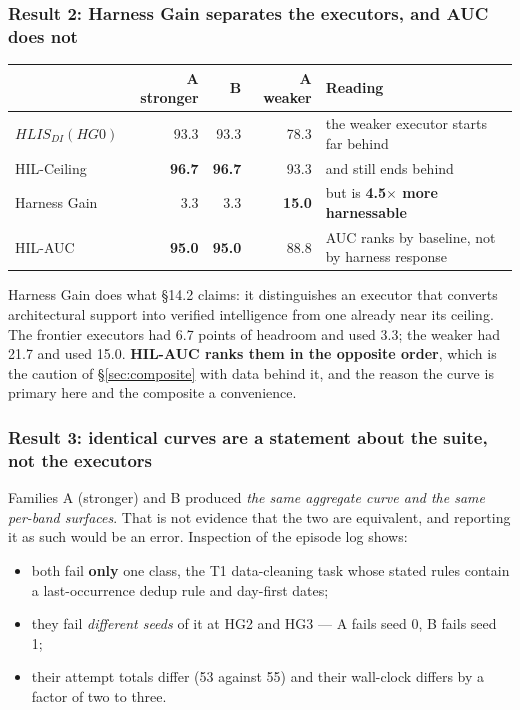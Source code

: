 \documentclass[11pt]{article}
\theoremstyle{definition}
\begin{document}
\subsubsection{Result 2: Harness Gain separates the executors, and AUC does not}

\begin{table}[h]
\centering\small
\begin{tabularx}{\textwidth}{@{}lrrrY@{}}
\toprule
& A stronger & B & A weaker & Reading \\
\midrule
$HLIS_{DI}(HG0)$ & 93.3 & 93.3 & 78.3 & the weaker executor starts far behind \\
HIL-Ceiling & \textbf{96.7} & \textbf{96.7} & 93.3 & and still ends behind \\
Harness Gain & 3.3 & 3.3 & \textbf{15.0} & but is \textbf{4.5$\times$ more harnessable} \\
HIL-AUC & \textbf{95.0} & \textbf{95.0} & 88.8 & AUC ranks by baseline, not by harness response \\
\bottomrule
\end{tabularx}
\end{table}

Harness Gain does what \S14.2 claims: it distinguishes an executor that converts architectural support into verified intelligence from one already near its ceiling. The frontier executors had 6.7 points of headroom and used 3.3; the weaker had 21.7 and used 15.0. \textbf{HIL-AUC ranks them in the opposite order}, which is the caution of \S\ref{sec:composite} with data behind it, and the reason the curve is primary here and the composite a convenience.

\subsubsection{Result 3: identical curves are a statement about the suite, not the executors}

Families A (stronger) and B produced \emph{the same aggregate curve and the same per-band surfaces}. That is not evidence that the two are equivalent, and reporting it as such would be an error. Inspection of the episode log shows:

\begin{itemize}
\item both fail \textbf{only} one class, the T1 data-cleaning task whose stated rules contain a last-occurrence dedup rule and day-first dates;
\item they fail \emph{different seeds} of it at HG2 and HG3 --- A fails seed 0, B fails seed 1;
\item their attempt totals differ (53 against 55) and their wall-clock differs by a factor of two to three.
\end{itemize}
\end{document}

